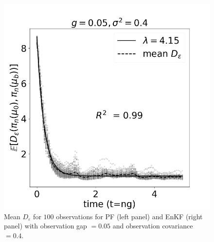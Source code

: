{\begin{figure}
    \includegraphics[scale=0.45]{probing-nfs/plots/plots-enkf-100_enkf.png}
    \caption{Mean $D_\varepsilon$ for $100$ observations for PF (left panel) and EnKF (right panel) with observation gap  $=0.05$ and observation covariance $=0.4$.}
    \label{fig:obs-100--probing-nfs}
\end{figure}
}




